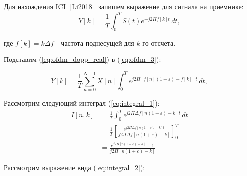
Для нахождения ICI [\ref{Li2018}] запишем выражение для сигнала на приемнике:
\begin{equation}
    Y[k] = \frac{1}{T} \int_{0}^{T} S(t) e^{-j 2 \Pi f[k] t} \,dt,
    \label{eq:ofdm_2}
\end{equation}

\noindent где $f[k] = k \Delta f$ - частота поднесущей для $k$-го отсчета.

\noindent Подставим (\ref{eq:ofdm_dopp_real}) в (\ref{eq:ofdm_3}):

\begin{equation}
    Y[k] = \frac{1}{T} \sum_{n = 0}^{N - 1} X[n] \int_{0}^{T}  e^{j 2 \Pi [f[n] (1 + \varepsilon ) - f[k]] t} \,dt,
    \label{eq:ofdm_3}
\end{equation}

\noindent Рассмотрим следующий интеграл (\ref{eq:integral_1}):
\begin{equation}
    \label{eq:integral_1}
    \begin{split}
        I[n, k] &= \frac{1}{T} \int_{0}^{T}  e^{j 2 \Pi \Delta f [n (1 + \varepsilon ) - k] t} \,dt \\
        &= \frac{1}{T} \left[ \frac{e^{j 2 \Pi \Delta f [n (1 + \varepsilon ) - k] t}}{j 2 \Pi \Delta f [n (1 + \varepsilon ) - k]} \right]_{0}^{T} \\
        &= \frac{e^{j 2 \Pi [n (1 + \varepsilon ) - k]} - 1}{j 2 \Pi [n (1 + \varepsilon ) - k]}
    \end{split}
\end{equation}

\noindent Рассмотрим выражение вида (\ref{eq:integral_2}):

